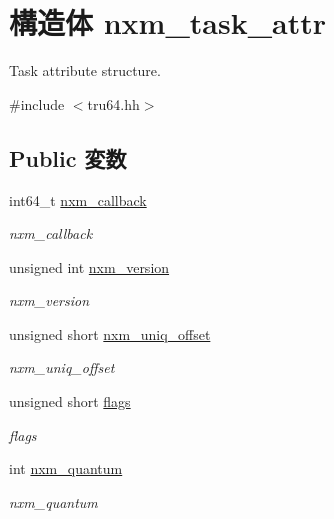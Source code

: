 \hypertarget{structTru64_1_1nxm__task__attr}{
\section{構造体 nxm\_\-task\_\-attr}
\label{structTru64_1_1nxm__task__attr}
}


Task attribute structure.  


{\ttfamily \#include $<$tru64.hh$>$}\subsection*{Public 変数}
\begin{DoxyCompactItemize}
\item 
int64\_\-t \hyperlink{structTru64_1_1nxm__task__attr_a3e280a023ffa784d26a4f41306d718f0}{nxm\_\-callback}
\begin{DoxyCompactList}\small\item\em nxm\_\-callback \item\end{DoxyCompactList}\item 
unsigned int \hyperlink{structTru64_1_1nxm__task__attr_a70d8998193fec354ad484f497c870676}{nxm\_\-version}
\begin{DoxyCompactList}\small\item\em nxm\_\-version \item\end{DoxyCompactList}\item 
unsigned short \hyperlink{structTru64_1_1nxm__task__attr_a3b5f76b3e0f76058019240a3c5dcaec1}{nxm\_\-uniq\_\-offset}
\begin{DoxyCompactList}\small\item\em nxm\_\-uniq\_\-offset \item\end{DoxyCompactList}\item 
unsigned short \hyperlink{structTru64_1_1nxm__task__attr_a1cbb17ede73ea044a04a129bf4d86976}{flags}
\begin{DoxyCompactList}\small\item\em flags \item\end{DoxyCompactList}\item 
int \hyperlink{structTru64_1_1nxm__task__attr_a1edf25e35f3eb9bddad20dec442db246}{nxm\_\-quantum}
\begin{DoxyCompactList}\small\item\em nxm\_\-quantum \item\end{DoxyCompactList}\item 

\end{DoxyCompactItemize}
